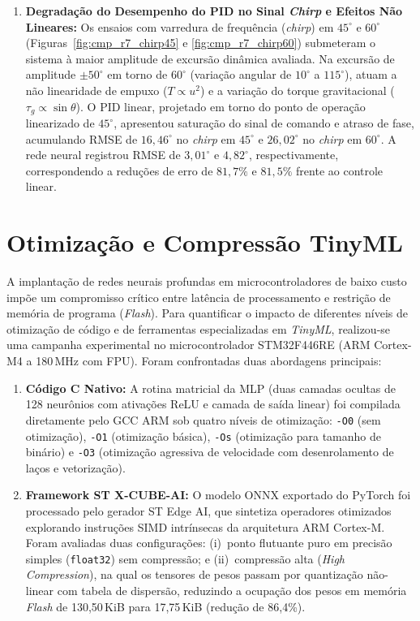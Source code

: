 \begin{enumerate}
    \item \textbf{Degradação do Desempenho do PID no Sinal \textit{Chirp} e Efeitos Não Lineares:} Os ensaios com varredura de frequência (\textit{chirp}) em $45^\circ$ e $60^\circ$ (Figuras~\ref{fig:cmp_r7_chirp45} e \ref{fig:cmp_r7_chirp60}) submeteram o sistema à maior amplitude de excursão dinâmica avaliada. Na excursão de amplitude $\pm 50^\circ$ em torno de $60^\circ$ (variação angular de $10^\circ$ a $115^\circ$), atuam a não linearidade de empuxo ($T \propto u^2$) e a variação do torque gravitacional ($\tau_g \propto \sin\theta$). O PID linear, projetado em torno do ponto de operação linearizado de $45^\circ$, apresentou saturação do sinal de comando e atraso de fase, acumulando RMSE de $16{,}46^\circ$ no \textit{chirp} em $45^\circ$ e $26{,}02^\circ$ no \textit{chirp} em $60^\circ$. A rede neural registrou RMSE de $3{,}01^\circ$ e $4{,}82^\circ$, respectivamente, correspondendo a reduções de erro de $81{,}7\%$ e $81{,}5\%$ frente ao controle linear.
\end{enumerate}

\section{Otimização e Compressão TinyML}
\label{sec:res_otimizacao_xcube}

A implantação de redes neurais profundas em microcontroladores de baixo custo impõe um compromisso crítico entre latência de processamento e restrição de memória de programa (\textit{Flash}). Para quantificar o impacto de diferentes níveis de otimização de código e de ferramentas especializadas em \textit{TinyML}, realizou-se uma campanha experimental no microcontrolador STM32F446RE (ARM Cortex-M4 a 180\,MHz com FPU). Foram confrontadas duas abordagens principais:
\begin{enumerate}
    \item \textbf{Código C Nativo:} A rotina matricial da MLP (duas camadas ocultas de 128 neurônios com ativações ReLU e camada de saída linear) foi compilada diretamente pelo GCC ARM sob quatro níveis de otimização: \texttt{-O0} (sem otimização), \texttt{-O1} (otimização básica), \texttt{-Os} (otimização para tamanho de binário) e \texttt{-O3} (otimização agressiva de velocidade com desenrolamento de laços e vetorização).
    \item \textbf{Framework ST X-CUBE-AI:} O modelo ONNX exportado do PyTorch foi processado pelo gerador ST Edge AI, que sintetiza operadores otimizados explorando instruções SIMD intrínsecas da arquitetura ARM Cortex-M. Foram avaliadas duas configurações: (i)~ponto flutuante puro em precisão simples (\texttt{float32}) sem compressão; e (ii)~compressão alta (\textit{High Compression}), na qual os tensores de pesos passam por quantização não-linear com tabela de dispersão, reduzindo a ocupação dos pesos em memória \textit{Flash} de 130,50\,KiB para 17,75\,KiB (redução de 86,4\%).
\end{enumerate}


